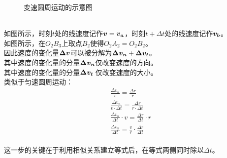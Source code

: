 \documentclass[UTF8]{ctexart}
\newcommand*{\veb}[1]{\vb*{#1}}
\begin{document}
\begin{figure}[h]
\begin{center}
{\begin{minipage}[t]{0.342\linewidth}
                \end{minipage}
            }
            \caption{变速圆周运动的示意图}
        \end{center}
    \end{figure}\\
    如图所示，时刻$t$处的线速度记作$\veb{v}=\veb{v_a}$，时刻$t+\Delta t$处的线速度记作$\veb{v_b}$。\\[3mm]
    如图所示，在$O_2B_3$上取点$B_2$使得$O_2A_2=O_2B_2$。\\[3mm]
    因此速度的变化量$\veb{\Delta v}$可以被分解为$\veb{\Delta v_n}+\veb{\Delta v_t}$。\\[3mm]
    其中速度的变化量的分量$\veb{\Delta v_n}$仅改变速度的方向。\\[3mm]
    其中速度的变化量的分量$\veb{\Delta v_t}\hspace{2.5pt}$仅改变速度的大小。\\[4mm]
    类似于匀速圆周运动：
    \begin{align}
        &\frac{\Delta v_n}{v}=\frac{\Delta r}{r}\\[3mm]
        &\frac{\Delta v_n}{v\cdot\Delta t}=\frac{\Delta r}{r\cdot \Delta t}\\[3mm]
        &\frac{\Delta v_n}{\Delta t}\cdot v=\frac{\Delta r}{\Delta t}\cdot r\\[3mm]
        &\frac{\Delta v_n}{\Delta t}=\frac{v}{r}\cdot\frac{\Delta r}{\Delta t}
    \end{align}\\
    这一步的关键在于利用相似关系建立等式后，在等式两侧同时除以$\Delta t$。
\end{document}
